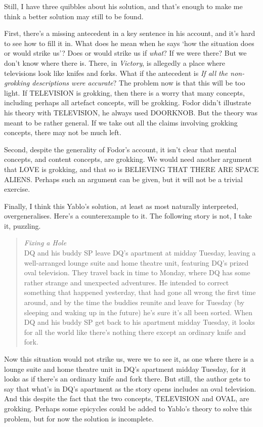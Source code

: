 Still, I have three quibbles about his solution, and that's enough to make me think a better solution may still to be found.

First, there's a missing antecedent in a key sentence in his account, and it's hard to see how to fill it in. What does he mean when he says `how the situation does or would strike us'? Does or would strike us if \textit{what}? If we were there? But we don't know where there is. There, in \textit{Victory}, is allegedly a place where televisions look like knifes and forks. What if the antecedent is \textit{If all the non-grokking descriptions were accurate}? The problem now is that this will be too light. If TELEVISION is grokking, then there is a worry that many concepts, including perhaps all artefact concepts, will be grokking. Fodor didn't illustrate his theory with TELEVISION, he always used DOORKNOB. But the theory was meant to be rather general. If we take out all the claims involving grokking concepts, there may not be much left.

Second, despite the generality of Fodor's account, it isn't clear that mental concepts, and content concepts, are grokking. We would need another argument that LOVE is grokking, and that so is BELIEVING THAT THERE ARE SPACE ALIENS. Perhaps such an argument can be given, but it will not be a trivial exercise.

Finally, I think this Yablo's solution, at least as most naturally interpreted, overgen\-eral\-ises. Here's a counterexample to it. The following story is not, I take it, puzzling.

\begin{quote}
\textit{Fixing a Hole} \\
DQ and his buddy SP leave DQ's apartment at midday Tuesday, leaving a well-arranged lounge suite and home theatre unit, featuring DQ's prized oval television. They travel back in time to Monday, where DQ has some rather strange and unexpected adventures. He intended to correct something that happened yesterday, that had gone all wrong the first time around, and by the time the buddies reunite and leave for Tuesday (by sleeping and waking up in the future) he's sure it's all been sorted. When DQ and his buddy SP get back to his apartment midday Tuesday, it looks for all the world like there's nothing there except an ordinary knife and fork.
\end{quote}

\noindent Now this situation would not strike us, were we to see it, as one where there is a lounge suite and home theatre unit in DQ's apartment midday Tuesday, for it looks as if there's an ordinary knife and fork there. But still, the author gets to say that what's in DQ's apartment as the story opens includes an oval television. And this despite the fact that the two concepts, TELEVISION and OVAL, are grokking. Perhaps some epicycles could be added to Yablo's theory to solve this problem, but for now the solution is incomplete.

